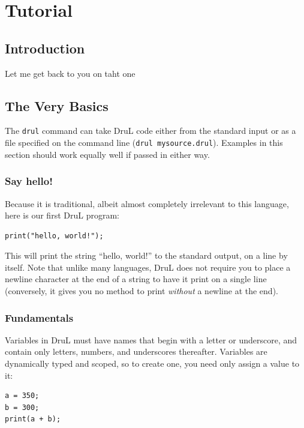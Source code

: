 \chapter{Tutorial}
\section{Introduction}

Let me get back to you on taht one

\section{The Very Basics}

The {\tt drul} command can take DruL code either from the standard input or as a file specified on the command line ({\tt drul mysource.drul}).  Examples in this section should work equally well if passed in either way.

\subsection{Say hello!}

Because it is traditional, albeit almost completely irrelevant to this language, here is our first
DruL program:

\begin{lstlisting}
print("hello, world!");
\end{lstlisting}

This will print the string ``hello, world!'' to the standard output, on a line by itself.  Note that unlike many languages, DruL does not require you to place a newline character at the end of a string to have it print on a single line (conversely, it gives you no method to print \emph{without} a newline at the end).

\subsection{Fundamentals}

Variables in DruL must have names that begin with a letter or underscore, and contain only letters, numbers, and underscores thereafter.  Variables are dynamically typed and scoped, so to create one, you need only assign a value to it:

\begin{lstlisting}
a = 350;
b = 300;
print(a + b);
\end{lstlisting}

